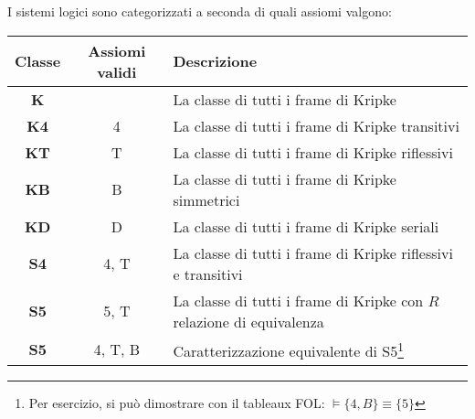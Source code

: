 I sistemi logici sono categorizzati a seconda di quali assiomi valgono:
\\

\bgroup
\def\arraystretch{1.5}
\begin{tabularx}{\textwidth}{|c c X|}
\hline
Classe & Assiomi validi & Descrizione\\
\hline
\textbf{K} & &La classe di tutti i frame di Kripke\\
\textbf{K4} & 4 &La classe di tutti i frame di Kripke transitivi\\
\textbf{KT} & T &La classe di tutti i frame di Kripke riflessivi\\
\textbf{KB} & B &La classe di tutti i frame di Kripke simmetrici\\
\textbf{KD} & D &La classe di tutti i frame di Kripke seriali\\
\textbf{S4} & 4, T &La classe di tutti i frame di Kripke riflessivi e transitivi\\
\textbf{S5} & 5, T &La classe di tutti i frame di Kripke con $R$ relazione di equivalenza\\
\textbf{S5} & 4, T, B &Caratterizzazione equivalente di S5\footnote{Per esercizio, si può dimostrare con il tableaux FOL: $\models \lbrace 4, B \rbrace \equiv \lbrace 5 \rbrace$} \\
\hline
\end{tabularx}
\egroup